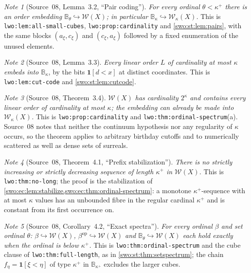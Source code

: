 \documentclass[11pt]{article}
\theoremstyle{definition}
\theoremstyle{remark}
\newtheorem{note}[note]{Note}
\newcommand{\W}{\mathcal W}
\newcommand{\B}{\mathbb B}
\newcommand{\emb}{\hookrightarrow}
\newcommand{\code}[1]{\texttt{\small #1}}
\begin{document}
\begin{note}[Source~08, Lemma~3.2, ``Pair coding'']\label{swo:sk:lem:pairs}
\emph{For every ordinal $\theta<\kappa^+$ there is an order embedding
$\B_\theta\emb\W(X)$; in particular $\B_\kappa\emb\W_\kappa(X)$.} This is
\code{lwo:lem:all-small-cubes}, \code{lwo:prop:cardinality} and
\cref{swo:st:lem:pairs}, with the same blocks $(a_\xi,c_\xi)$ and
$(c_\xi,a_\xi)$ followed by a fixed enumeration of the unused elements.
\end{note}

\begin{note}[Source~08, Lemma~3.3]\label{swo:sk:lem:cutbits}
\emph{Every linear order $L$ of cardinality at most $\kappa$ embeds into
$\B_\kappa$}, by the bits $\mathbf 1[d<x]$ at distinct coordinates. This is
\code{lwo:lem:cut-code} and \cref{swo:st:lem:cutcode}.
\end{note}

\begin{note}[Source~08, Theorem~3.4]\label{swo:sk:thm:setcard}
\emph{$\W(X)$ has cardinality $2^\kappa$ and contains every linear order of
cardinality at most $\kappa$; the embedding can already be made into
$\W_\kappa(X)$.} This is \code{lwo:prop:cardinality} and
\code{lwo:thm:ordinal-spectrum}(a). Source~08 notes that neither the continuum
hypothesis nor any regularity of $\kappa$ occurs, so the theorem applies to
arbitrary birthday cutoffs and to numerically scattered as well as dense sets
of surreals.
\end{note}

\begin{note}[Source~08, Theorem~4.1, ``Prefix stabilization'']\label{swo:sk:thm:nochains}
\emph{There is no strictly increasing or strictly decreasing sequence of length
$\kappa^+$ in $\W(X)$.} This is \code{lwo:thm:no-long}; the proof is the
stabilization of \cref{swo:ec:lem:stabilize,swo:ec:thm:ordinal-spectrum}: a
monotone $\kappa^+$-sequence with at most $\kappa$ values has an unbounded
fibre in the regular cardinal $\kappa^+$ and is constant from its first
occurrence on.
\end{note}

\begin{note}[Source~08, Corollary~4.2, ``Exact spectra'']\label{swo:sk:cor:spectra}
\emph{For every ordinal $\beta$ and set ordinal $\theta$: $\beta\emb\W(X)$,
$\beta^{\mathrm{op}}\emb\W(X)$ and $\B_\theta\emb\W(X)$ each hold exactly when
the ordinal is below $\kappa^+$.} This is \code{lwo:thm:ordinal-spectrum} and
the cube clause of \code{lwo:thm:full-length}, as in
\cref{swo:st:thm:setspectrum}; the chain $f_\eta=\mathbf 1[\xi<\eta]$ of type
$\kappa^+$ in $\B_{\kappa^+}$ excludes the larger cubes.
\end{note}
\end{document}
